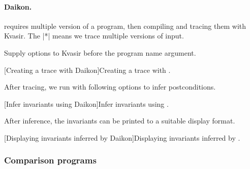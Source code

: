 \paragraph*{Daikon.}
 requires multiple version of a program, then compiling and tracing them with Kvasir.
The \pr|*| means we trace multiple versions of input.
\newline

Supply options to Kvasir before the program name argument.

\begin{center}
\begin{minipage}{\textwidth}
\captionsetup{type=lstlisting}
[Creating a trace with Daikon]{Creating a trace with .}
\label{lst:kvasir-bash}
\end{minipage}
\end{center}

After tracing, we run  with following options to infer postconditions.

\begin{center}
\begin{minipage}{\textwidth}
\captionsetup{type=lstlisting}
[Infer invariants using Daikon]{Infer invariants using .}
\label{lst:daikon-bash}
\end{minipage}
\end{center}

After inference, the invariants can be printed to a suitable display format.

\begin{center}
\begin{minipage}{\textwidth}
\captionsetup{type=lstlisting}
[Displaying invariants inferred by Daikon]{Displaying invariants inferred by .}
\label{lst:print-bash}
\end{minipage}
\end{center}

\subsubsection{Comparison programs}
\label{subsec:comparison-programs}

